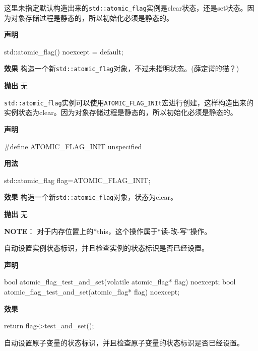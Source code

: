 
这里未指定默认构造出来的\texttt{std::atomic\_flag}实例是clear状态，还是set状态。因为对象存储过程是静态的，所以初始化必须是静态的。

\textbf{声明}

\begin{cpp}
std::atomic_flag() noexcept = default;
\end{cpp}

\textbf{效果}
构造一个新\texttt{std::atomic\_flag}对象，不过未指明状态。(薛定谔的猫？)

\textbf{抛出}
无


\texttt{std::atomic\_flag}实例可以使用\texttt{ATOMIC\_FLAG\_INIt}宏进行创建，这样构造出来的实例状态为clear。因为对象存储过程是静态的，所以初始化必须是静态的。

\textbf{声明}

\begin{cpp}
#define ATOMIC_FLAG_INIT unspecified
\end{cpp}

\textbf{用法}

\begin{cpp}
std::atomic_flag flag=ATOMIC_FLAG_INIT;
\end{cpp}

\textbf{效果}
构造一个新\texttt{std::atomic\_flag}对象，状态为clear。

\textbf{抛出}
无

\textbf{NOTE}：
对于内存位置上的*this，这个操作属于“读-改-写”操作。


自动设置实例状态标识，并且检查实例的状态标识是否已经设置。

\textbf{声明}

\begin{cpp}
bool atomic_flag_test_and_set(volatile atomic_flag* flag) noexcept;
bool atomic_flag_test_and_set(atomic_flag* flag) noexcept;
\end{cpp}

\textbf{效果}

\begin{cpp}
return flag->test_and_set();
\end{cpp}


自动设置原子变量的状态标识，并且检查原子变量的状态标识是否已经设置。

